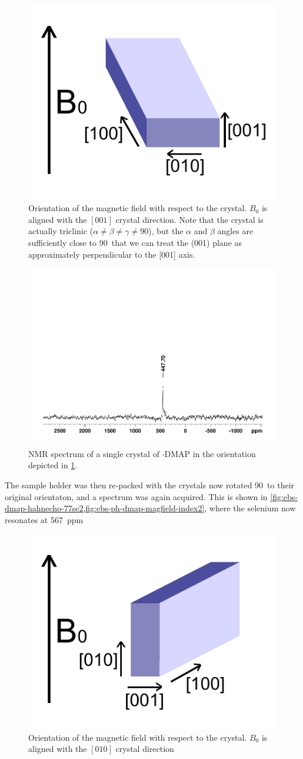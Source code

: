 \begin{refsection}
\begin{figure}
  \centering
  \includegraphics[width=0.3\linewidth]{Figures/ebs-ph-dmap-magfield-index.pdf}
  \caption[Orientation of the magnetic field with respect to the crystal.]{Orientation of the magnetic field with respect to the crystal. $B_{0}$ is aligned with the $[0 0 1]$ crystal direction. Note that the crystal is actually triclinic ($\alpha\neq\beta\neq\gamma\neq 90$\degree), but the $\alpha$ and $\beta$ angles are sufficiently close to 90\degree\ that we can treat the (001) plane as approximately perpendicular to the [001] axis.}
  \label{fig:ebs-ph-dmap-magfield-index}
\end{figure}

\begin{figure}
  \centering
  \includegraphics[width=0.8\linewidth]{Figures/ebs-dmap-hahnecho-77se.pdf}
  \caption{ NMR spectrum of a single crystal of $\cdot$DMAP in the orientation depicted in \cref{fig:ebs-ph-dmap-magfield-index}.}
  \label{fig:ebs-dmap-hahnecho-77se}
\end{figure}

The sample holder was then re-packed with the crystals now rotated 90\degree\ to their original orientaton, and a spectrum was again acquired.
This is shown in \cref{fig:ebs-dmap-hahnecho-77se2,fig:ebs-ph-dmap-magfield-index2}, where the selenium now resonates at 567~ppm

\begin{figure}
  \centering
  \includegraphics[width=0.3\linewidth]{Figures/ebs-ph-dmap-magfield-index2.pdf}
  \caption[Orientation of the magnetic field with respect to the crystal.]{Orientation of the magnetic field with respect to the crystal. $B_{0}$ is aligned with the $[0 1 0]$ crystal direction}
  \label{fig:ebs-ph-dmap-magfield-index2}
\end{figure}


\end{refsection}
